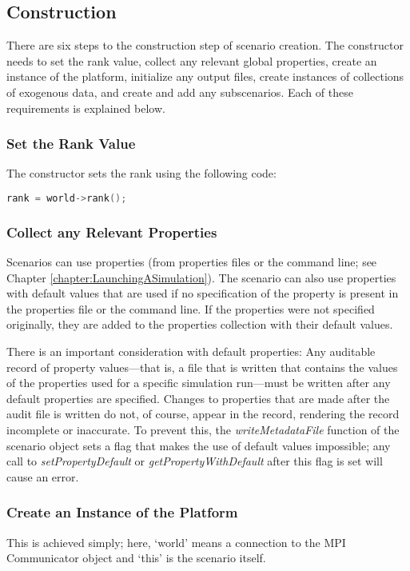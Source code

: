 \subsection{Construction}
There are six steps to the construction step of scenario creation. The constructor needs to set the rank value, collect any relevant global properties, create an instance of the platform, initialize any output files, create instances of collections of exogenous data, and create and add any subscenarios. Each of these requirements is explained below.

\subsubsection{Set the Rank Value}
The constructor sets the rank using the following code:
	\begin{lstlisting}[frame=single, language=C++]
  	rank = world->rank();
	\end{lstlisting}

\subsubsection{Collect any Relevant Properties}
\par Scenarios can use properties (from properties files or the command line; see Chapter \ref{chapter:LaunchingASimulation}). The scenario can also use properties with default values that are used if no specification of the property is present in the properties file or the command line. If the properties were not specified originally, they are added to the properties collection with their default values.

\par There is an important consideration with default properties: Any auditable record of property values---that is, a file that is written that contains the values of the properties used for a specific simulation run---must be written after any default properties are specified. Changes to properties that are made after the audit file is written do not, of course, appear in the record, rendering the record incomplete or inaccurate. To prevent this, the \textit{writeMetadataFile} function of the scenario object sets a flag that makes the use of default values impossible; any call to \textit{setPropertyDefault} or \textit{getPropertyWithDefault} after this flag is set will cause an error.

\subsubsection{Create an Instance of the Platform}
This is achieved simply; here, `world' means a connection to the MPI Communicator object and `this' is the scenario itself.

